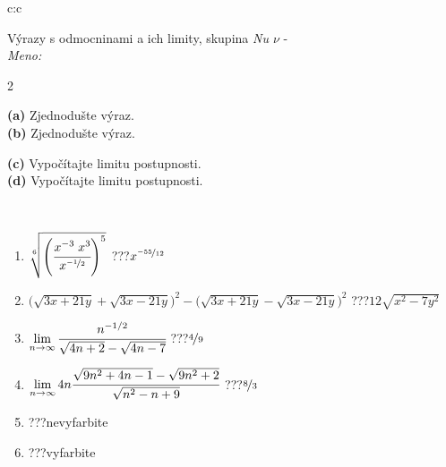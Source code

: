 \documentclass[10pt]{report}
\begin{document}
\begin{tabular}{c:c}
\begin{minipage}[c][104.5mm][t]{0.5\linewidth}
\begin{center}
\vspace{7mm}
{\huge {\Large Výrazy s odmocninami a ich limity}, skupina \textit{Nu $\nu$} -}\\[5mm]
\textit{Meno:}\phantom{xxxxxxxxxxxxxxxxxxxxxxxxxxxxxxxxxxxxxxxxxxxxxxxxxxxxxxxxxxxxxxxxx}\\[5mm]
\begin{minipage}{0.95\linewidth}
\begin{center}
{\small \begin{multicols}{2} \raggedright
\phantom{xxxxxxxxx}\textbf{(a)} Zjednodušte výraz. \\[1mm]
\phantom{xxxxxxxxx}\textbf{(b)} Zjednodušte výraz. \par \columnbreak
\textbf{(c)} Vypočítajte limitu postupnosti. \\[1mm]
\textbf{(d)} Vypočítajte limitu postupnosti.
\end{multicols}
}
\end{center}
\end{minipage}
\\[4mm]
\begin{minipage}{0.79\linewidth}
\begin{center}
\begin{varwidth}{\linewidth}
\begin{enumerate}
\small
\item $\sqrt[6]{\left(\cfrac{x^{-3}\;x^{3}}{x^{\nicefrac{-1}{2}}}\right)^{5}}$\quad \dotfill\; ???\;\dotfill \quad $x^{\nicefrac{-55}{12}}$
\item {\footnotesize{\scriptsize$\big(\sqrt{3x+21y}+\sqrt{3x-21y}\big)^2-\big(\sqrt{3x+21y}-\sqrt{3x-21y}\big)^2$}\quad \dotfill\; ???\;\dotfill \quad $12\sqrt{x^2-7y^2}$}
\item $\lim\limits_{n\to\infty}\cfrac{n^{-1/2}}{\sqrt{4n+2}-\sqrt{4n-7}}$\quad \dotfill\; ???\;\dotfill \quad $\nicefrac{4}{9}$
\item $\lim\limits_{n\to\infty}4n\cfrac{\sqrt{9n^2+4n-1}-\sqrt{9n^2+2}}{\sqrt{n^2-n+9}}$\quad \dotfill\; ???\;\dotfill \quad $\nicefrac{8}{3}$
\item \quad \dotfill\; ???\;\dotfill \quad nevyfarbite
\item \quad \dotfill\; ???\;\dotfill \quad vyfarbite
\end{enumerate}
\end{varwidth}

\end{center}
\end{minipage}
\end{center}
\end{minipage}
\end{tabular}
\end{document}
